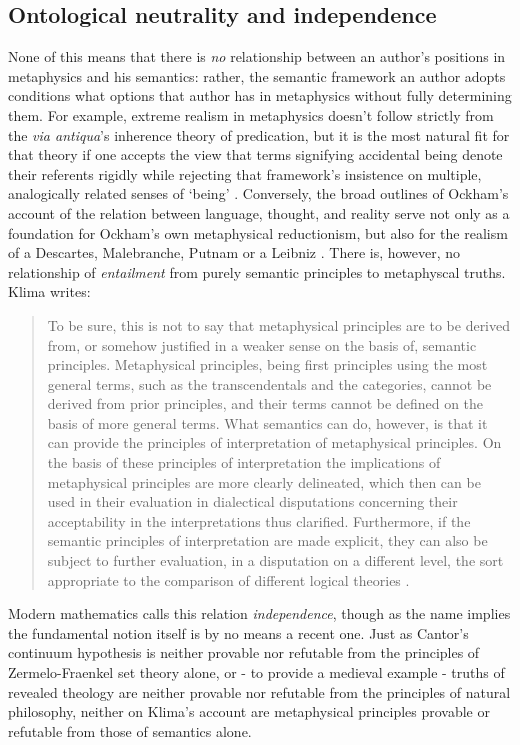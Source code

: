 \documentclass[]{article}
\begin{document}
\subsection{Ontological neutrality and independence}
None of this means that there is \emph{no} relationship between an author's positions in metaphysics and his semantics: 
rather, 
the semantic framework an author adopts conditions what options that author has in metaphysics without fully determining them. 
For example, extreme realism in metaphysics doesn't follow strictly from the \emph{via antiqua}'s inherence theory of predication, 
but it is the most natural fit for that theory 
if one accepts the view that terms signifying accidental being denote their referents rigidly 
while rejecting that framework's insistence on multiple, analogically related senses of `being' \autocite[125]{Klima1999}. 
Conversely, the broad outlines of Ockham's account of the relation between language, thought, and reality 
serve not only as a foundation for Ockham's own metaphysical reductionism, 
but also for the realism of a Descartes, Malebranche, Putnam or a Leibniz \autocite{Klima1991}. 
There is, however, no relationship of \emph{entailment} from purely semantic principles to metaphyscal truths. Klima writes: 
\begin{quote}
To be sure, this is not to say that metaphysical principles are to be derived from, or somehow justified 
in a weaker sense on the basis of, semantic principles. Metaphysical principles, being first principles 
using the most general terms, such as the transcendentals and the categories, cannot be derived from 
prior principles, and their terms cannot be defined on the basis of more general terms. What 
semantics can do, however, is that it can provide the principles of interpretation of metaphysical 
principles. On the basis of these principles of interpretation the implications of metaphysical 
principles are more clearly delineated, which then can be used in their evaluation in dialectical 
disputations concerning their acceptability in the interpretations thus clarified. Furthermore, if the 
semantic principles of interpretation are made explicit, they can also be subject to further evaluation, 
in a disputation on a different level, the sort appropriate to the comparison of different logical 
theories  \autocite[49]{Klima2011b}.
\end{quote}
Modern mathematics calls this relation \emph{independence}, 
though as the name implies the fundamental notion itself is by no means a recent one. 
Just as Cantor's continuum hypothesis is neither provable nor refutable from the principles of Zermelo-Fraenkel set theory alone, 
or - to provide a medieval example - 
truths of revealed theology are neither provable nor refutable from the principles of natural philosophy, 
neither on Klima's account are metaphysical principles provable or refutable from those of semantics alone. 
\end{document}
